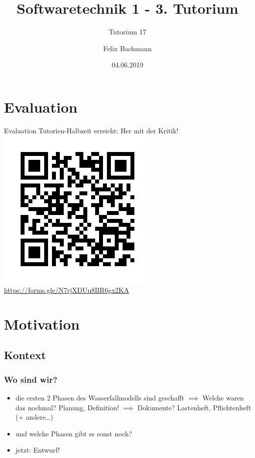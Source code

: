 \documentclass[18pt]{beamer}
\title[SWT1]{Softwaretechnik 1 - 3. Tutorium}
\subtitle{Tutorium 17}
\author{Felix Bachmann}
\date{04.06.2019}
\institute{KIT - Institut für Programmstrukturen und Datenorganisation (IPD)}
\begin{document}

\begin{frame}
\titlepage
\end{frame}

\section{Evaluation}
	\begin{frame}{Evaluation}
	\centering Tutorien-Halbzeit erreicht: Her mit der Kritik!
	\centering \includegraphics[scale=0.6]{pics/tut3/frame.png}
	\url{https://forms.gle/N7rjXDUu8BR6gx2KA}
\end{frame}

\section{Motivation}
	\subsection{Kontext}
		\begin{frame}
			\frametitle{Wo sind wir?}
			\begin{itemize}
				\item die ersten 2 Phasen des Wasserfallmodells sind geschafft
				\pause
				\linebreak $\implies$ Welche waren das nochmal? \pause Planung, Definition!
				\pause
				\linebreak $\implies$ Dokumente? \pause Lastenheft, Pflichtenheft (+ andere\dots)
				\pause
				\item und welche Phasen gibt es sonst noch? \pause
				\item  jetzt: Entwurf!
			\end{itemize}
		\end{frame}
	
\end{document}
